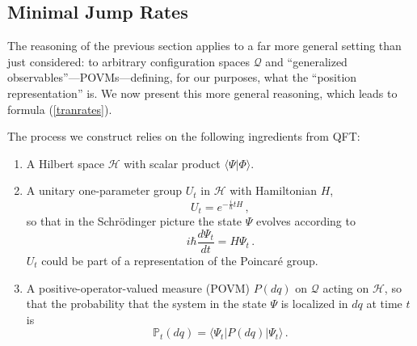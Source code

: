 \documentclass[12pt]{article}
\newcommand{\E}{e} %
\newcommand{\I}{i} %
\newcommand{\1}{\mathbf{1}} %
\newcommand{\Hilbert}{\mathscr{H}}
\renewcommand{\sp}[2]{\langle #1 | #2 \rangle} %
\newcommand{\conf}{\mathcal{Q}} %
\newcommand{\measure}{\mathbb{P}} %
\newcommand{\pov}{{P}}%
\begin{document}
\subsection{Minimal Jump Rates}
\label{sec:mini2}

The reasoning of the previous section applies to a far more general
setting than just considered: to arbitrary configuration spaces
$\conf$ and ``generalized observables''---POVMs---defining, for our
purposes, what the ``position representation'' is. We now present this
more general reasoning, which leads to formula (\ref{tranrates}).

The process we construct relies on the following ingredients from QFT:
\begin{enumerate}
\item A Hilbert space $\Hilbert$ with scalar product $\sp{\Psi}
   {\Phi}$.

\item A unitary one-parameter group $U_t$ in $\Hilbert$ with
   Hamiltonian $H$,
   \[
     U_t = \E^{-\frac{\I}{\hbar}tH}\,,
   \]
   so that in the Schr\"odinger picture the state $\Psi$ evolves
   according to
   \begin{equation}
     \I\hbar\frac{d\Psi_t}{dt} = H\Psi_t\,.
   \end{equation}
   $U_t$ could be part of a representation of the Poincar\'e group.

\item A positive-operator-valued measure (POVM) $\pov(dq)$ on $\conf$
   acting on $\Hilbert$, so that the probability that the system in the
   state $\Psi$ is localized in $dq$ at time $t$ is
   \begin{equation} \label{mis}
     \measure_t(dq)= \sp{\Psi_t}{\pov(dq)| \Psi_t} \,.
   \end{equation}
\end{enumerate}
\end{document}
